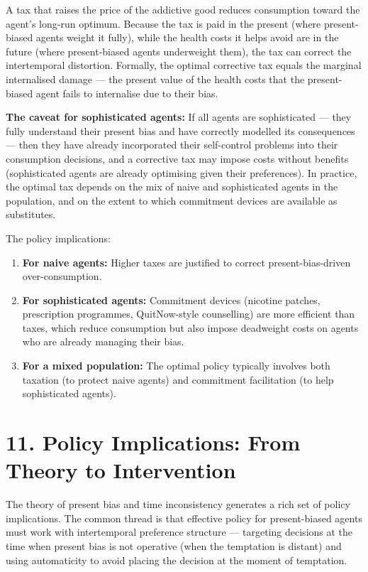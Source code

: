 \documentclass[12pt, letterpaper]{article}
\begin{document}
A tax that raises the price of the addictive good reduces consumption toward the agent's long-run optimum. Because the tax is paid in the present (where present-biased agents weight it fully), while the health costs it helps avoid are in the future (where present-biased agents underweight them), the tax can correct the intertemporal distortion. Formally, the optimal corrective tax equals the marginal internalised damage --- the present value of the health costs that the present-biased agent fails to internalise due to their bias.

\textbf{The caveat for sophisticated agents:} If all agents are sophisticated --- they fully understand their present bias and have correctly modelled its consequences --- then they have already incorporated their self-control problems into their consumption decisions, and a corrective tax may impose costs without benefits (sophisticated agents are already optimising given their preferences). In practice, the optimal tax depends on the mix of naive and sophisticated agents in the population, and on the extent to which commitment devices are available as substitutes.

The policy implications:
\begin{enumerate}
\item \textbf{For naive agents:} Higher taxes are justified to correct present-bias-driven over-consumption.
\item \textbf{For sophisticated agents:} Commitment devices (nicotine patches, prescription programmes, QuitNow-style counselling) are more efficient than taxes, which reduce consumption but also impose deadweight costs on agents who are already managing their bias.
\item \textbf{For a mixed population:} The optimal policy typically involves both taxation (to protect naive agents) and commitment facilitation (to help sophisticated agents).
\end{enumerate}

\medskip


\section{11. Policy Implications: From Theory to Intervention}


The theory of present bias and time inconsistency generates a rich set of policy implications. The common thread is that effective policy for present-biased agents must work with intertemporal preference structure --- targeting decisions at the time when present bias is not operative (when the temptation is distant) and using automaticity to avoid placing the decision at the moment of temptation.
\end{document}
